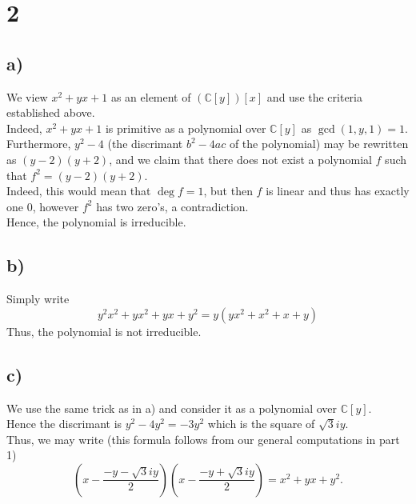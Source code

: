 \documentclass[11pt, a4paper]{article}
\begin{document}
\section*{2}
\subsection*{a)}
We view $ x^{2}+ yx + 1$ as an element of $ ( \mathbb{C}[y] ) [ x] $ and use the criteria established above.\\
Indeed, $ x^{2}+ yx +1$ is primitive as a polynomial over $ \mathbb{C}[y]$ as $ \gcd( 1, y,1) = 1$.\\
Furthermore, $ y^{2}-4$ (the discrimant $ b^{2}-4ac$ of the polynomial)  may be rewritten as $ ( y-2) ( y+2) $, and we claim that there does not exist a polynomial $f$ such that $ f^{2}= ( y-2) ( y+2) $.\\
Indeed, this would mean that $ \deg f = 1$, but then $f$ is linear and thus has exactly one 0, however $f^{2}$ has two zero's, a contradiction.\\
Hence, the polynomial is irreducible.
\subsection*{b)}
Simply write
\[ 
y^{2}x^{2} + yx^{2} + yx + y^{2} = y ( yx^{2} + x^{2} + x + y) 
\]
Thus, the polynomial is not irreducible.
\subsection*{c)}
We use the same trick as in a) and consider it as a polynomial over $ \mathbb{C}[y]$.\\
Hence the discrimant is $ y^{2}-4y^{2}= -3y^{2}$ which is the square of $ \sqrt{3} i y$.\\
Thus, we may write (this formula follows from our general computations in part 1) 
\[ 
	(x - \frac{- y - \sqrt{3} i y}{2}) ( x- \frac{-y + \sqrt{3} i y}{2}) = x^{2} + yx + y^{2}.
\]










				
\end{document}
